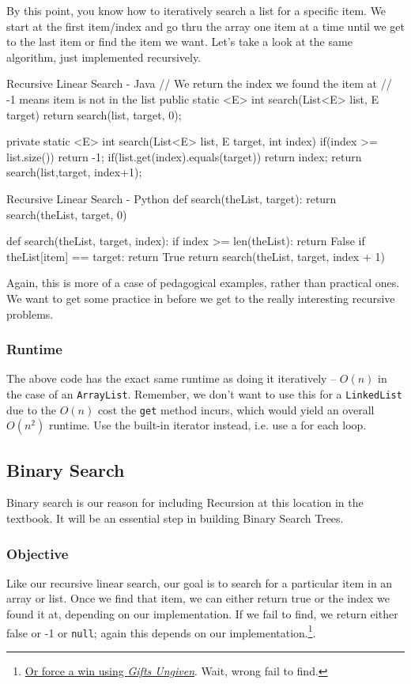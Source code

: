 By this point, you know how to iteratively search a list for a specific item.  We start at the first item/index and go thru the array one item at a time until we get to the last item or find the item we want.   Let's take a look at the same algorithm, just implemented recursively.


\begin{javacode}{Recursive Linear Search - Java}
// We return the index we found the item at
// -1 means item is not in the list
public static <E> int search(List<E> list, E target){
	return search(list, target, 0);
}

private static <E> int search(List<E> list, E target, int index) {
	if(index >= list.size()){
		return -1;
	}
	if(list.get(index).equals(target)){
		return index;
	}
	return search(list,target, index+1);
}
\end{javacode}

\begin{pycode}{Recursive Linear Search - Python}
def search(theList, target):
	return search(theList, target, 0)

def search(theList, target, index):
	if index >= len(theList):
		return False 
	if theList[item] == target:
		return True
	return search(theList, target, index + 1)
\end{pycode}



Again, this is more of a case of pedagogical examples, rather than practical ones.  We want to get some practice in before we get to the really interesting recursive problems.  

\subsubsection{Runtime}  
The above code has the exact same runtime as doing it iteratively -- $O(n)$ in the case of an \texttt{ArrayList}. Remember, we don't want to use this for a \texttt{LinkedList} due to the $O(n)$ cost the \texttt{get} method incurs, which would yield an overall $O(n^2)$ runtime. Use the built-in iterator instead, i.e. use a for each loop.
\subsection{Binary Search}
Binary search is our reason for including Recursion at this location in the textbook.   It will be an essential step in building Binary Search Trees.


\subsubsection{Objective}
Like our recursive linear search, our goal is to search for a particular item in an array or list.  Once we find that item, we can either return true or the index we found it at, depending on our implementation.  If we fail to find, we return either false or -1 or \texttt{null}; again this depends on our implementation.\footnote{ \href{https://scryfall.com/card/chk/62/gifts-ungiven}{Or force a win using \textit{Gifts Ungiven}}.  Wait, wrong fail to find.}.

